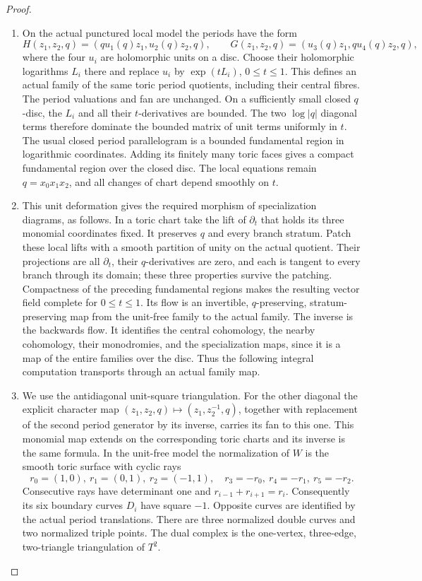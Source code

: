 \begin{proof}
\begin{enumerate}[label=\arabic*.]
\item On the actual punctured local model the periods have the form
\[
 H(z_1,z_2,q)=(q u_1(q)z_1,u_2(q)z_2,q),\qquad
 G(z_1,z_2,q)=(u_3(q)z_1,q u_4(q)z_2,q),
\]
where the four \(u_i\) are holomorphic units on a disc.  Choose their
holomorphic logarithms \(L_i\) there and replace \(u_i\) by
\(\exp(tL_i)\), \(0\leq t\leq1\).  This defines an actual family
of the same toric period quotients, including their central fibres.
The period valuations and fan are unchanged.  On a sufficiently
small closed \(q\)-disc, the \(L_i\) and all their \(t\)-derivatives
are bounded.  The two \(\log|q|\) diagonal terms therefore dominate
the bounded matrix of unit terms uniformly in \(t\).  The usual
closed period parallelogram is a bounded fundamental region in
logarithmic coordinates.  Adding its finitely many toric faces gives
a compact fundamental region over the closed disc.  The local
equations remain \(q=x_0x_1x_2\), and all changes of chart depend
smoothly on \(t\).

\item This unit deformation gives the required morphism of
specialization diagrams, as follows.  In a toric chart take the lift
of \(\partial_t\) that holds its three monomial coordinates fixed.
It preserves \(q\) and every branch stratum.  Patch these local lifts
with a smooth partition of unity on the actual quotient.  Their
projections are all \(\partial_t\), their \(q\)-derivatives are zero,
and each is tangent to every branch through its domain; these three
properties survive the patching.  Compactness of the preceding
fundamental regions makes the resulting vector field complete for
\(0\leq t\leq1\).  Its flow is an invertible, \(q\)-preserving,
stratum-preserving map from the unit-free family to the actual
family.  The inverse is the backwards flow.  It identifies the
central cohomology, the nearby cohomology, their monodromies, and
the specialization maps, since it is a map of the entire families
over the disc.  Thus the following integral computation transports
through an actual family map.

\item We use the antidiagonal unit-square triangulation.  For the
other diagonal the explicit character map
\((z_1,z_2,q)\mapsto(z_1,z_2^{-1},q)\), together with replacement
of the second period generator by its inverse, carries its fan to
this one.  This monomial map extends on the corresponding toric
charts and its inverse is the same formula.  In the unit-free model
the normalization of \(W\) is the smooth toric surface with cyclic
rays
\[
 r_0=(1,0),\ r_1=(0,1),\ r_2=(-1,1),\quad
 r_3=-r_0,\ r_4=-r_1,\ r_5=-r_2.
\]
Consecutive rays have determinant one and
\(r_{i-1}+r_{i+1}=r_i\).  Consequently its six boundary curves
\(D_i\) have square \(-1\).  Opposite curves are identified by
the actual period translations.  There are three normalized double
curves and two normalized triple points.  The dual complex is the
one-vertex, three-edge, two-triangle triangulation of \(T^2\).


\end{enumerate}
\end{proof}
